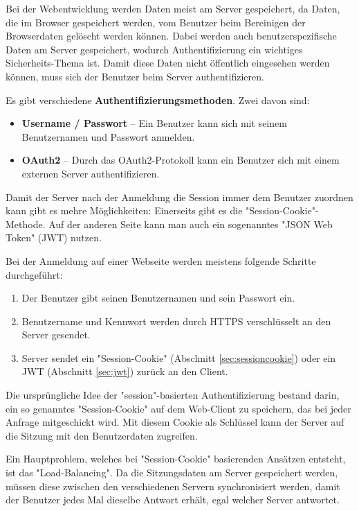 

Bei der Webentwicklung werden Daten meist am Server gespeichert, da Daten, die im Browser gespeichert werden, vom Benutzer beim Bereinigen der Browserdaten gelöscht werden können. 
Dabei werden auch benutzerspezifische Daten am Server gespeichert, wodurch Authentifizierung ein wichtiges Sicherheits-Thema ist.
Damit diese Daten nicht öffentlich eingesehen werden können, muss sich der Benutzer beim Server authentifizieren.

Es gibt verschiedene \textbf{Authentifizierungsmethoden}. Zwei davon sind:
\begin{itemize} 
    \item \textbf{Username / Passwort} -- Ein Benutzer kann sich mit seinem Benutzernamen und Passwort anmelden.
    \item \textbf{OAuth2} -- Durch das OAuth2-Protokoll kann ein Benutzer sich mit einem externen Server authentifizieren. \cite{OAuth2}
\end{itemize}

Damit der Server nach der Anmeldung die Session immer dem Benutzer zuordnen kann gibt es mehre Möglichkeiten:
Einerseits gibt es die "Session-Cookie"-Methode. Auf der anderen Seite kann man auch ein sogenanntes "JSON Web Token" (JWT) nutzen.

Bei der Anmeldung auf einer Webseite werden meistens folgende Schritte durchgeführt:
\begin{enumerate}
    \item Der Benutzer gibt seinen Benutzernamen und sein Passwort ein.
    \item Benutzername und Kennwort werden durch HTTPS verschlüsselt an den Server gesendet.
    \item Server sendet ein "Session-Cookie" (Abschnitt \ref{sec:sessioncookie}) oder ein JWT (Abschnitt \ref{sec:jwt}) zurück an den Client.
\end{enumerate}

\pagebreak
{}\label{sec:sessioncookie}

Die ursprüngliche Idee der "session"-basierten Authentifizierung bestand darin, ein so genanntes "Session-Cookie" auf dem Web-Client zu speichern, das bei jeder Anfrage mitgeschickt wird. Mit diesem Cookie als Schlüssel kann der Server auf die Sitzung mit den Benutzerdaten zugreifen. 

Ein Hauptproblem, welches bei "Session-Cookie" basierenden Ansätzen entsteht, ist das "Load-Balancing". 
Da die Sitzungsdaten am Server gespeichert werden, müssen diese zwischen den verschiedenen Servern synchronisiert werden, damit der Benutzer jedes Mal dieselbe Antwort erhält, egal welcher Server antwortet. 

